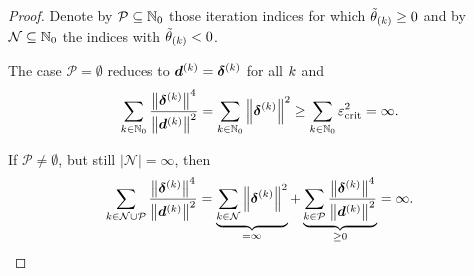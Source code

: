 \documentclass{article}
\theoremstyle{plain}
\theoremstyle{definition}
\begin{document}
\begin{proof}
	Denote by $\mathcal P\subseteq \mathbb N_0$ those iteration
	indices for which $\tilde{\theta}_{(k)} \geq 0$ and 
	by $\mathcal N\subseteq \mathbb N_0$ the indices with 
	$\tilde{\theta}_{(k)} < 0$.
	
	The case $\mathcal P = \emptyset$ reduces to
	$\bm{d}^{(k)} = \bm{\delta}^{(k)}$ for all $k$ and 
	$$
	\sum_{k \in \mathbb N_0}
	\frac{\left\|\bm{\delta}^{(k)}\right\|^4}{\left\|\bm{d}^{(k)}\right\|^2}
	=
	\sum_{k \in \mathbb N_0}
	\left\|\bm{\delta}^{(k)}\right\|^2
	\geq \sum_{k \in \mathbb N_0} \varepsilon_{\mathrm{crit}}^2
	= 
	\infty.
	$$

	If $\mathcal P \neq \emptyset$, but still
	$|\mathcal N| = \infty$, then
	$$
	\sum_{k \in \mathcal N \cup \mathcal P}
	\frac{\left\|\bm{\delta}^{(k)}\right\|^4}{\left\|\bm{d}^{(k)}\right\|^2}
	=
	\underbrace{
		\sum_{k \in \mathcal N} \left\|\bm{\delta}^{(k)}\right\|^2
	}_{=\infty}
	+
	\underbrace{
		\sum_{k \in \mathcal P}
		\frac{\left\|\bm{\delta}^{(k)}\right\|^4}{\left\|\bm{d}^{(k)}\right\|^2}
	}_{\geq 0}
	= \infty.
	$$


\end{proof}
\end{document}
